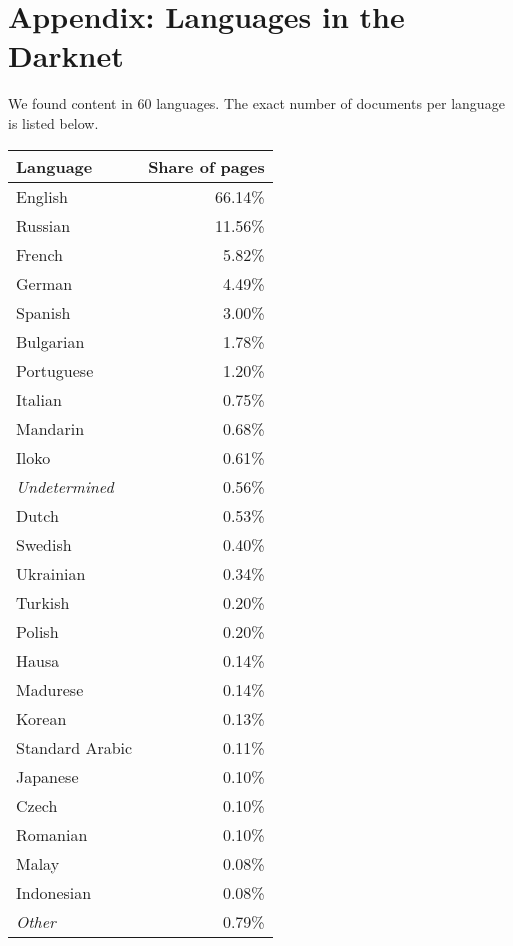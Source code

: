 \section{Appendix: Languages in the Darknet}
\label{appendix:B}
We found content in 60 languages. The exact number of documents per language is listed below.
\ifdgruyter
\begin{center}
    \label{table:languages}
    \begin{supertabular}[H]{l|r}
    \textbf{Language} &	\textbf{Share of pages}	\\
    \hline
    \hline
	English		&	66.14\%\\
	\hline
	Russian		&	11.56\%\\
	\hline
	French		&	5.82\%\\
	\hline
	German		&	4.49\%\\
	\hline
	Spanish		&	3.00\%\\
	\hline
	Bulgarian	&	1.78\%\\
	\hline
	Portuguese	&	1.20\%\\
	\hline
	Italian	&	0.75\%\\
	\hline
	Mandarin	&	0.68\%\\
	\hline
	Iloko		&	0.61\%\\
	\hline
	\textit{Undetermined}	&	0.56\%\\
	\hline
	Dutch		&	0.53\%\\
	\hline
	Swedish		&	0.40\%\\
	\hline
	Ukrainian	&	0.34\%\\
	\hline
	Turkish		&	0.20\%\\
	\hline
	Polish		&	0.20\%\\
	\hline
	Hausa		&	0.14\%\\
	\hline
	Madurese	&	0.14\%\\
	\hline
	Korean		&	0.13\%\\
	\hline
	Standard Arabic	&	0.11\%\\
	\hline
	Japanese	&	0.10\%\\
	\hline
	Czech		&	0.10\%\\
	\hline
	Romanian	&	0.10\%\\
	\hline
	Malay		&	0.08\%\\
	\hline
	Indonesian	&	0.08\%\\
	\hline
	\textit{Other}		&	0.79\%\\
    \end{supertabular}
\end{center}
\fi
\iflncs
